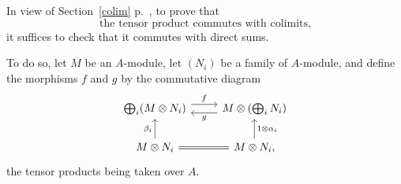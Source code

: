 \documentclass[parskip=half,fontsize=12pt]{scrartcl}%
\newcommand{\ds}{\displaystyle}
\begin{document}
%
\begin{comment}
Assume we have an inductive system $(M_i)$ of $A$-modules indexed by a category  $I$, that is, for each object $i$ of $I$ we have an $A$-module $M_i$, and for each morphism $f:d(f)\to c(f)$ in $I$ we have an $A$-linear map $M_f:M_{c(f)}\to M_{d(f)}$. 

Define the morphisms $u$ and $v$ by the commutative diagram
$$
\begin{tikzcd}
M_{d(f)}\ar[d,"\alpha_{f}"']\ar[r,equal]&M_{d(f)}\ar[d,"\beta_{d(f)}"]\\ 
\ds\bigoplus_gM_{d(g)}\ar[r,yshift=0.9ex,"u"]\ar[r,yshift=-0.9ex,"v"']&\ds\bigoplus_iM_i\\ 
M_{d(f)}\ar[u,"\alpha_{f}"]\ar[r,"M_f"']&M_{c(f),}\ar[u,"\beta_{c(f)}"']
\end{tikzcd}
$$ 
where the $\alpha_f$ and the $\beta_i$ are the coprojections. 

We claim that the cokernel of $u-v$ is a colimit of our system, or equivalently, that the middle row of the commutative diagram 
$$
\begin{tikzcd}
M_{d(f)}\ar[d,"\alpha_{f}"']\ar[r,equal]&M_{d(f)}\ar[d,"\beta_{d(f)}"]\\ 
\ds\bigoplus_gM_{d(g)}\ar[r,"u-v"]&\ds\bigoplus_iM_i\ar[r]&\ds\ooo{colim}_iM_i\ar[r]&0\\ 
M_{d(f)}\ar[u,"\alpha_{f}"]\ar[r,"M_f"']&M_{c(f)}\ar[u,"\beta_{c(f)}"']
\end{tikzcd}
$$ 
is exact. 

The proof is left to the reader. 
\end{comment}
%

In view of Section~\ref{colim} p.~\pageref{colim}, to prove that 
\begin{equation}\label{tpcwc}
\text{the tensor product commutes with colimits,} 
\end{equation}
it suffices to check that it commutes with direct sums. 

To do so, let $M$ be an $A$-module, let $(N_i)$ be a family of $A$-module, and define the morphisms $f$ and $g$ by the commutative diagram 
$$
\begin{tikzcd} 
\bigoplus_i(M\otimes N_i)\ar[r,yshift=0.9ex,"f"]\ar[r,leftarrow,yshift=-0.9ex,"g"']& M\otimes\left(\bigoplus_iN_i\right)\\ 
M\otimes N_i\ar[u,"\beta_i"]\ar[r,equal]&M\otimes N_i,\ar[u,"1\otimes\alpha_i"']
\end{tikzcd}
$$ 
the tensor products being taken over $A$.
\end{document}

